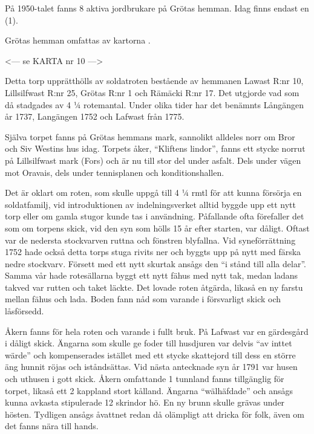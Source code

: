 På 1950-talet fanns 8 aktiva jordbrukare på Grötas hemman. Idag finns endast en (1).

Grötas hemman omfattas av kartorna .


<--- se KARTA nr 10 --->


%



%
Detta torp upprätthölls av soldatroten bestående av hemmanen Lawast R:nr 10, Lillsilfwast R:nr 25, Grötas R:nr 1 och Rämäcki R:nr 17. Det utgjorde vad som då stadgades av 4 ¼ rotemantal. Under olika tider har det benämnts Långängen år 1737, Langängen 1752 och Lafwast från 1775.

Själva torpet fanns på Grötas hemmans mark, sannolikt alldeles norr om Bror och Siv Westins hus idag. Torpets åker, ``Kliftens lindor'', fanns ett stycke norrut på Lillsilfwast mark (Fors) och är nu till stor del under asfalt. Dels under vägen mot Oravais, dels under tennisplanen och konditionshallen.

Det är oklart om roten, som skulle uppgå till 4 ¼ rmtl för att kunna försörja en soldatfamilj, vid introduktionen av indelningsverket alltid byggde upp ett nytt torp eller om gamla stugor kunde tas i användning. Påfallande ofta förefaller det som om torpens skick, vid den syn som hölls 15 år efter starten, var dåligt. Oftast var de nedersta stockvarven ruttna och fönstren blyfallna. Vid syneförrättning 1752 hade också detta torps stuga rivits ner och byggts upp på nytt med färska nedre stockvarv. Försett med ett nytt skurtak ansågs den ``i stånd till alla delar''. Samma vår hade rotesällarna byggt ett nytt fähus med nytt tak, medan ladans takved var rutten och taket läckte. Det lovade roten åtgärda, likaså en ny farstu mellan fähus och lada. Boden fann nåd som varande i försvarligt skick och låsförsedd.

Åkern fanns för hela roten och varande i fullt bruk. På Lafwast var en gärdesgård i dåligt skick. Ängarna som skulle ge foder till husdjuren var delvis ``av inttet wärde'' och kompenserades istället med ett stycke skattejord till dess en större äng hunnit röjas och iståndsättas. Vid nästa antecknade syn år 1791 var husen och uthusen i gott skick. Åkern omfattande 1 tunnland fanns tillgänglig för torpet, likaså ett 2 kappland stort kålland. Ängarna ``wälhäfdade'' och ansågs kunna avkasta stipulerade 12 skrindor hö. En ny brunn skulle grävas under hösten. Tydligen ansågs åvattnet redan då olämpligt att dricka för folk, även om det fanns nära till hands.

